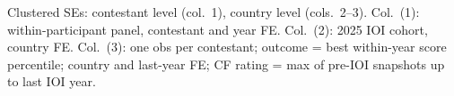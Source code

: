 \begin{table}[htbp]
   \par \raggedright 
   Clustered SEs: contestant level (col.~1), country level (cols.~2--3). Col.~(1): within-participant panel, contestant and year FE. Col.~(2): 2025 IOI cohort, country FE. Col.~(3): one obs per contestant; outcome = best within-year score percentile; country and last-year FE; CF rating = max of pre-IOI snapshots up to last IOI year.
\end{table}


